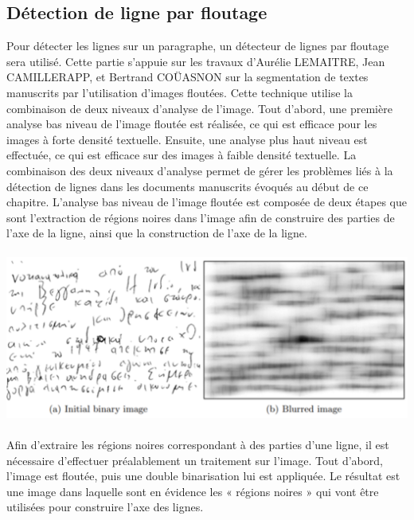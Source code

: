 \subsection{Détection de ligne par floutage}

Pour détecter les lignes sur un paragraphe, un détecteur de lignes par floutage sera utilisé. Cette partie s'appuie sur les
travaux d'Aurélie LEMAITRE, Jean CAMILLERAPP, et Bertrand COÜASNON sur la segmentation de textes manuscrits par l’utilisation
d’images floutées. Cette technique utilise la combinaison de deux niveaux d'analyse de l'image. Tout d'abord, une première
analyse bas niveau de l'image floutée est réalisée, ce qui est efficace pour les images à forte densité textuelle. Ensuite,
une analyse plus haut niveau est effectuée, ce qui est efficace sur des images à faible densité textuelle. La combinaison des
deux niveaux d'analyse permet de gérer les problèmes liés à la détection de lignes dans les documents manuscrits évoqués au
début de ce chapitre. L'analyse bas niveau de l'image floutée est composée de deux étapes que sont l'extraction de régions
noires dans l'image afin de construire des parties de l'axe de la ligne, ainsi que la construction de l'axe de la ligne.

\paragraph{}
\begin{mdframed}[frametitle={Figure 11 : Floutage d'une image}, innerbottommargin=10]
\begin{center}
\includegraphics[width=0.6\linewidth]{detect1.png}
\end{center}
\end{mdframed}

\paragraph{}
Afin d'extraire les régions noires correspondant à des parties d'une ligne, il est nécessaire d'effectuer préalablement un
traitement sur l'image. Tout d'abord, l'image est floutée, puis une double binarisation lui est appliquée. Le résultat est
une image dans laquelle sont en évidence les « régions noires » qui vont être utilisées pour construire l'axe des lignes.


